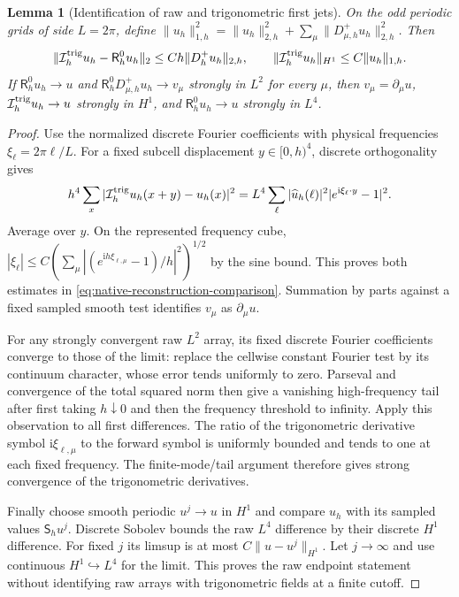 \documentclass[11pt]{article}
\numberwithin{equation}{section}
\newtheorem{lemma}[lemma]{Lemma}
\theoremstyle{definition}
\theoremstyle{remark}
\newcommand{\ii}{\mathrm i}
\newcommand{\norm}[1]{\lVert#1\rVert}
\begin{document}
\begin{lemma}[Identification of raw and trigonometric first jets]
\label{lem:native-reconstruction-identification}
On the odd periodic grids of side $L=2\pi$, define
$\norm{u_h}_{1,h}^2=\norm{u_h}_{2,h}^2+
\sum_\mu\norm{D^+_{\mu,h}u_h}_{2,h}^2$.
Then
\begin{equation}
 \norm{\mathcal I_h^{\rm trig}u_h-\mathsf R_h^0u_h}_2
       \le Ch\norm{D_h^+u_h}_{2,h},\qquad
 \norm{\mathcal I_h^{\rm trig}u_h}_{H^1}\le C\norm{u_h}_{1,h}.
 \label{eq:native-reconstruction-comparison}
\end{equation}
If $\mathsf R_h^0u_h\to u$ and
$\mathsf R_h^0D^+_{\mu,h}u_h\to v_\mu$ strongly in $L^2$ for every $\mu$,
then $v_\mu=\partial_\mu u$,
$\mathcal I_h^{\rm trig}u_h\to u$ strongly in $H^1$, and
$\mathsf R_h^0u_h\to u$ strongly in $L^4$.
\end{lemma}
\begin{proof}
Use the normalized discrete Fourier coefficients with physical frequencies
$\xi_\ell=2\pi\ell/L$.  For a fixed subcell displacement $y\in[0,h)^4$,
discrete orthogonality gives
\[
 h^4\sum_x|\mathcal I_h^{\rm trig}u_h(x+y)-u_h(x)|^2
 =L^4\sum_\ell|\widehat u_h(\ell)|^2
                         |e^{\ii\xi_\ell\cdot y}-1|^2.
\]
Average over $y$.  On the represented frequency cube,
$|\xi_\ell|\le C(\sum_\mu
|(e^{\ii h\xi_{\ell,\mu}}-1)/h|^2)^{1/2}$ by the sine bound.
This proves both estimates in \eqref{eq:native-reconstruction-comparison}.
Summation by parts against a fixed sampled smooth test identifies $v_\mu$
as $\partial_\mu u$.

For any strongly convergent raw $L^2$ array, its fixed discrete Fourier
coefficients converge to those of the limit: replace the cellwise constant
Fourier test by its continuum character, whose error tends uniformly to
zero.  Parseval and convergence of the total squared norm then give a
vanishing high-frequency tail after first taking $h\downarrow0$ and then
the frequency threshold to infinity.  Apply this observation to all first
differences.  The ratio of the trigonometric derivative symbol
$\ii\xi_{\ell,\mu}$ to the forward symbol is uniformly bounded and tends
to one at each fixed frequency.  The finite-mode/tail argument therefore
gives strong convergence of the trigonometric derivatives.

Finally choose smooth periodic $u^j\to u$ in $H^1$ and compare $u_h$ with
its sampled values $\mathsf S_hu^j$.  Discrete Sobolev bounds the raw
$L^4$ difference by their discrete $H^1$ difference.  For fixed $j$ its
limsup is at most $C\norm{u-u^j}_{H^1}$.  Let $j\to\infty$ and use
continuous $H^1\hookrightarrow L^4$ for the limit.  This proves the raw
endpoint statement without identifying raw arrays with trigonometric
fields at a finite cutoff.
\end{proof}
\end{document}
